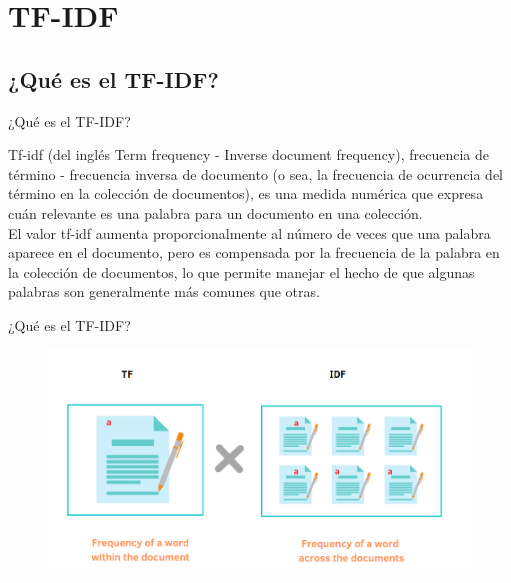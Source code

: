 \section{TF-IDF}\label{sec:tfidf}

\subsection{¿Qué es el TF-IDF?}
\begin{frame}{¿Qué es el TF-IDF?}
    \begin{center}
        Tf-idf (del inglés Term frequency - Inverse document frequency), frecuencia de término - 
        frecuencia inversa de documento (o sea, la frecuencia de ocurrencia del término en la colección de documentos),
        es una medida numérica que expresa cuán relevante es una palabra para un documento en una colección.\\
        \pause
        \vspace*{1cm}
        El valor tf-idf aumenta proporcionalmente al número de veces que una palabra aparece en el documento, 
        pero es compensada por la frecuencia de la palabra en la colección de documentos, lo que permite 
        manejar el hecho de que algunas palabras son generalmente más comunes que otras.
    \end{center}
\end{frame}

\begin{frame}{¿Qué es el TF-IDF?}
    \begin{figure}
        \includegraphics[width=0.9\framewidth]{fotos/tfidf.png}
    \end{figure}
\end{frame}

